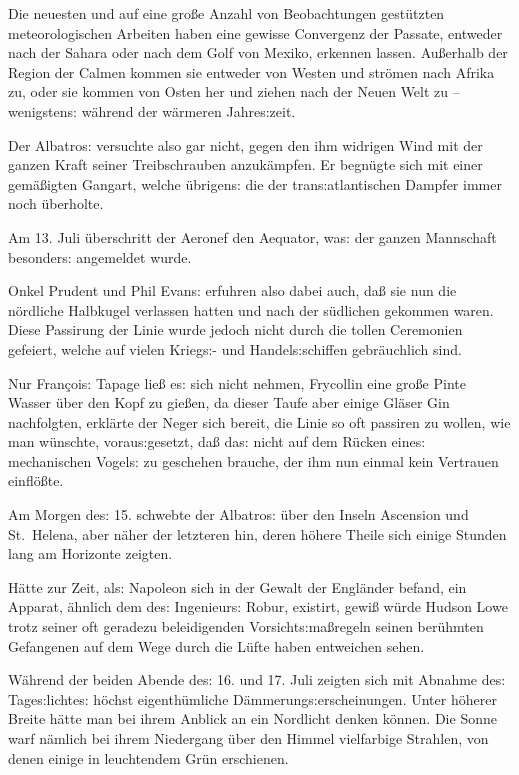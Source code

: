 \documentclass[oneside,12pt]{book}
\newcommand{\s}{s:}
\begin{document}
Die neuesten und auf eine gro{\ss}e Anzahl von Beobachtungen
gest\"utzten meteorologischen Arbeiten haben eine gewisse Convergenz
der Passate, entweder nach der Sahara oder nach dem Golf von Mexiko,
erkennen lassen. Au{\ss}erhalb der Region der Calmen kommen sie
entweder von Westen und str\"omen nach Afrika zu, oder sie kommen von
Osten her und ziehen nach der Neuen Welt zu -- wenigsten{\s}
w\"ahrend der w\"armeren Jahre{\s}zeit.

Der {\glqq}Albatro{\s}{\grqq} versuchte also gar nicht, gegen den ihm
widrigen Wind mit der ganzen Kraft seiner Treibschrauben anzuk\"ampfen.
Er begn\"ugte sich mit einer gem\"a{\ss}igten Gangart, welche
\"ubrigen{\s} die der tran{\s}atlantischen Dampfer immer noch
\"uberholte.

Am 13. Juli \"uberschritt der Aeronef den Aequator, wa{\s} der ganzen
Mannschaft besonder{\s} angemeldet wurde.

Onkel Prudent und Phil Evan{\s} erfuhren also dabei auch, da{\ss} sie
nun die n\"ordliche Halbkugel verlassen hatten und nach der
s\"udlichen gekommen waren. Diese Passirung der Linie wurde jedoch
nicht durch die tollen Ceremonien gefeiert, welche auf vielen
Krieg{\s}- und Handel{\s}schiffen gebr\"auchlich sind.

Nur Fran\c{c}oi{\s} Tapage lie{\ss} e{\s} sich nicht nehmen,
Frycollin eine gro{\ss}e Pinte Wasser \"uber den Kopf zu gie{\ss}en,
da dieser Taufe aber einige Gl\"aser Gin nachfolgten, erkl\"arte der
Neger sich bereit, die Linie so oft passiren zu wollen, wie man
w\"unschte, vorau{\s}gesetzt, da{\ss} da{\s} nicht auf dem R\"ucken
eine{\s} mechanischen Vogel{\s} zu geschehen brauche, der ihm nun
einmal kein Vertrauen einfl\"o{\ss}te.

Am Morgen de{\s} 15. schwebte der {\glqq}Albatro{\s}{\grqq} \"uber
den Inseln Ascension und St.~Helena, aber n\"aher der letzteren hin,
deren h\"ohere Theile sich einige Stunden lang am Horizonte zeigten.

H\"atte zur Zeit, al{\s} Napoleon sich in der Gewalt der Engl\"ander
befand, ein Apparat, \"ahnlich dem de{\s} Ingenieur{\s} Robur,
existirt, gewi{\ss} w\"urde Hudson Lowe trotz seiner oft geradezu
beleidigenden Vorsicht{\s}ma{\ss}regeln seinen ber\"uhmten Gefangenen
auf dem Wege durch die L\"ufte haben entweichen sehen.

W\"ahrend der beiden Abende de{\s} 16. und 17. Juli zeigten sich mit
Abnahme de{\s} Tage{\s}lichte{\s} h\"ochst eigenth\"umliche
D\"ammerung{\s}erscheinungen. Unter h\"oherer Breite h\"atte man bei
ihrem Anblick an ein Nordlicht denken k\"onnen. Die Sonne warf
n\"amlich bei ihrem Niedergang \"uber den Himmel vielfarbige
Strahlen, von denen einige in leuchtendem Gr\"un erschienen.
\end{document}
